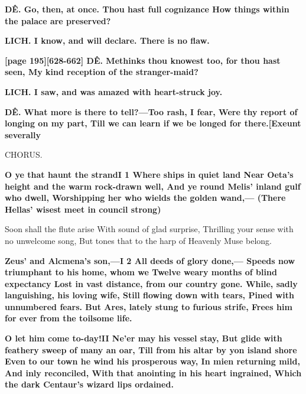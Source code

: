 \documentclass[11pt,letter]{book}
\begin{document}
\par \textbf{DÊ. Go, then, at once. Thou hast full cognizance How things within the palace are preserved?}
\par 

\par \textbf{LICH. I know, and will declare. There is no flaw.}
\par 

\par \textbf{[page 195][628-662] DÊ. Methinks thou knowest too, for thou hast seen, My kind reception of the stranger-maid?}
\par 

\par \textbf{LICH. I saw, and was amazed with heart-struck joy.}
\par 

\par \textbf{DÊ. What more is there to tell?—Too rash, I fear, Were thy report of longing on my part, Till we can learn if we be longed for there.[Exeunt severally}
\par 

\par  CHORUS.

\par \textbf{O ye that haunt the strandI 1 Where ships in quiet land Near Oeta’s height and the warm rock-drawn well, And ye round Melis’ inland gulf who dwell, Worshipping her who wields the golden wand,— (There Hellas’ wisest meet in council strong)}
\par   Soon shall the flute arise With sound of glad surprise, Thrilling your sense with no unwelcome song, But tones that to the harp of Heavenly Muse belong.

\par \textbf{Zeus’ and Alcmena’s son,—I 2 All deeds of glory done,— Speeds now triumphant to his home, whom we Twelve weary months of blind expectancy Lost in vast distance, from our country gone. While, sadly languishing, his loving wife, Still flowing down with tears, Pined with unnumbered fears. But Ares, lately stung to furious strife, Frees him for ever from the toilsome life.}
\par 

\par \textbf{O let him come to-day!II Ne’er may his vessel stay, But glide with feathery sweep of many an oar, Till from his altar by yon island shore Even to our town he wind his prosperous way, In mien returning mild, And inly reconciled, With that anointing in his heart ingrained, Which the dark Centaur’s wizard lips ordained.}
\par 
\end{document}
